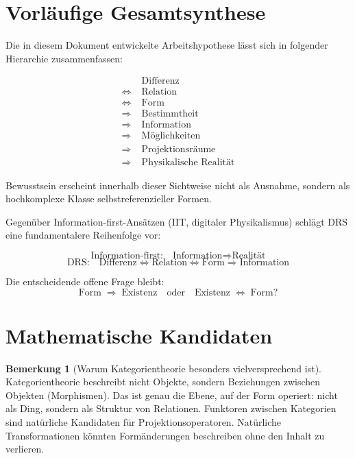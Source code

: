 \documentclass[11pt,a4paper]{article}
\theoremstyle{plain}
\theoremstyle{definition}
\newtheorem{remark}{Bemerkung}[section]
\begin{document}
\section{Vorl\"{a}ufige Gesamtsynthese}

Die in diesem Dokument entwickelte Arbeitshypothese l\"{a}sst sich in folgender
Hierarchie zusammenfassen:

\[
  \boxed{
  \begin{aligned}
    &\text{Differenz} \\
    \Longleftrightarrow\;&\text{Relation} \\
    \Longleftrightarrow\;&\text{Form} \\
    \Longrightarrow\;&\text{Bestimmtheit} \\
    \Longrightarrow\;&\text{Information} \\
    \Longrightarrow\;&\text{M\"{o}glichkeiten} \\
    \Longrightarrow\;&\text{Projektionsr\"{a}ume} \\
    \Longrightarrow\;&\text{Physikalische Realit\"{a}t}
  \end{aligned}
  }
\]

Bewusstsein erscheint innerhalb dieser Sichtweise nicht als Ausnahme, sondern als
hochkomplexe Klasse selbstreferenzieller Formen.

Gegen\"{u}ber Information-first-Ans\"{a}tzen (IIT, digitaler Physikalismus) schlägt
DRS eine fundamentalere Reihenfolge vor:

\[
  \text{Information-first:}\quad
  \text{Information} \Longrightarrow \text{Realit\"{a}t}
\]
\[
  \text{DRS:}\quad
  \text{Differenz} \Longleftrightarrow \text{Relation}
  \Longleftrightarrow \text{Form} \Longrightarrow \text{Information}
\]

Die entscheidende offene Frage bleibt:
\[
  \text{Form} \;\Longrightarrow\; \text{Existenz}
  \quad\text{oder}\quad
  \text{Existenz} \;\Longleftrightarrow\; \text{Form}?
\]

\section{Mathematische Kandidaten}

\begin{remark}[Warum Kategorientheorie besonders vielversprechend ist]
Kategorientheorie beschreibt nicht Objekte, sondern Beziehungen zwischen Objekten
(Morphismen). Das ist genau die Ebene, auf der Form operiert: nicht als Ding,
sondern als Struktur von Relationen. Funktoren zwischen Kategorien sind nat\"{u}rliche
Kandidaten f\"{u}r Projektionsoperatoren. Nat\"{u}rliche Transformationen k\"{o}nnten
Form\"{a}nderungen beschreiben ohne den Inhalt zu verlieren.
\end{remark}
\end{document}
